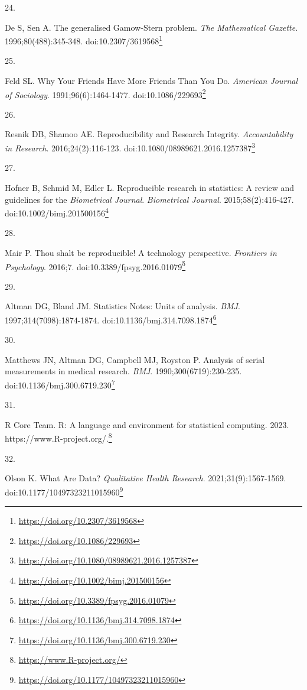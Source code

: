 \documentclass[
  a4paper,
]{book}
\newlength{\cslhangindent}
\newlength{\csllabelwidth}
\newlength{\cslentryspacingunit} %
\newenvironment{CSLReferences}[2] %
 {%
  \setlength{\parindent}{0pt}
  \ifodd #1
  \let\oldpar\par
  \def\par{\hangindent=\cslhangindent\oldpar}
  \fi
  \setlength{\parskip}{#2\cslentryspacingunit}
 }%
 {}
\newcommand{\CSLLeftMargin}[1]{\parbox[t]{\csllabelwidth}{#1}}
\newcommand{\CSLRightInline}[1]{\parbox[t]{\linewidth - \csllabelwidth}{#1}\break}
\renewcommand{\href}[2]{#2\footnote{\url{#1}}}
\begin{document}
\begin{CSLReferences}{0}{0}
\leavevmode{}%
\CSLLeftMargin{24. }%
\CSLRightInline{De S, Sen A. The generalised Gamow-Stern problem. \emph{The Mathematical Gazette}. 1996;80(488):345-348. doi:\href{https://doi.org/10.2307/3619568}{10.2307/3619568}}

\leavevmode{}%
\CSLLeftMargin{25. }%
\CSLRightInline{Feld SL. Why Your Friends Have More Friends Than You Do. \emph{American Journal of Sociology}. 1991;96(6):1464-1477. doi:\href{https://doi.org/10.1086/229693}{10.1086/229693}}

\leavevmode{}%
\CSLLeftMargin{26. }%
\CSLRightInline{Resnik DB, Shamoo AE. Reproducibility and Research Integrity. \emph{Accountability in Research}. 2016;24(2):116-123. doi:\href{https://doi.org/10.1080/08989621.2016.1257387}{10.1080/08989621.2016.1257387}}

\leavevmode{}%
\CSLLeftMargin{27. }%
\CSLRightInline{Hofner B, Schmid M, Edler L. Reproducible research in statistics: A review and guidelines for the {\emph{Biometrical Journal}}. \emph{Biometrical Journal}. 2015;58(2):416-427. doi:\href{https://doi.org/10.1002/bimj.201500156}{10.1002/bimj.201500156}}

\leavevmode{}%
\CSLLeftMargin{28. }%
\CSLRightInline{Mair P. Thou shalt be reproducible! A technology perspective. \emph{Frontiers in Psychology}. 2016;7. doi:\href{https://doi.org/10.3389/fpsyg.2016.01079}{10.3389/fpsyg.2016.01079}}

\leavevmode{}%
\CSLLeftMargin{29. }%
\CSLRightInline{Altman DG, Bland JM. Statistics Notes: Units of analysis. \emph{BMJ}. 1997;314(7098):1874-1874. doi:\href{https://doi.org/10.1136/bmj.314.7098.1874}{10.1136/bmj.314.7098.1874}}

\leavevmode{}%
\CSLLeftMargin{30. }%
\CSLRightInline{Matthews JN, Altman DG, Campbell MJ, Royston P. Analysis of serial measurements in medical research. \emph{BMJ}. 1990;300(6719):230-235. doi:\href{https://doi.org/10.1136/bmj.300.6719.230}{10.1136/bmj.300.6719.230}}

\leavevmode{}%
\CSLLeftMargin{31. }%
\CSLRightInline{R Core Team. R: A language and environment for statistical computing. 2023. \href{https://www.R-project.org/}{https://www.R-project.org/.}}

\leavevmode{}%
\CSLLeftMargin{32. }%
\CSLRightInline{Olson K. What Are Data? \emph{Qualitative Health Research}. 2021;31(9):1567-1569. doi:\href{https://doi.org/10.1177/10497323211015960}{10.1177/10497323211015960}}


\end{CSLReferences}
\end{document}
